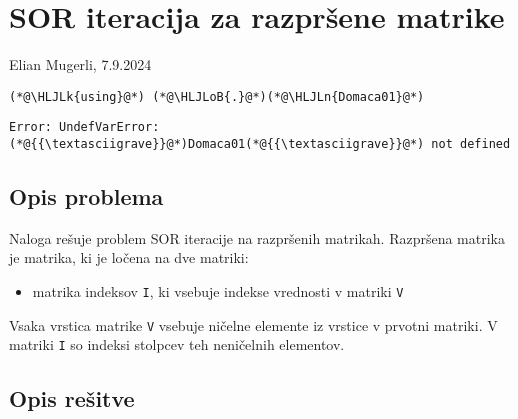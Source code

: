 \documentclass[12pt,a4paper]{article}
\newcommand{\HLJLk}[1]{\textcolor[RGB]{148,91,176}{\textbf{#1}}}
\newcommand{\HLJLn}[1]{#1}
\newcommand{\HLJLoB}[1]{\textcolor[RGB]{102,102,102}{\textbf{#1}}}
\begin{document}
\section{SOR iteracija za razpršene matrike}
Elian Mugerli, 7.9.2024


\begin{lstlisting}
(*@\HLJLk{using}@*) (*@\HLJLoB{.}@*)(*@\HLJLn{Domaca01}@*)
\end{lstlisting}

\begin{lstlisting}
Error: UndefVarError: (*@{{\textasciigrave}}@*)Domaca01(*@{{\textasciigrave}}@*) not defined
\end{lstlisting}


\subsection{Opis problema}

Naloga rešuje problem SOR iteracije na razpršenih matrikah. Razpršena matrika je matrika, ki je ločena na dve matriki:

\begin{itemize}
\item matrika indeksov \texttt{I}, ki vsebuje indekse vrednosti v matriki \texttt{V}

\end{itemize}
Vsaka vrstica matrike \texttt{V} vsebuje ničelne elemente iz vrstice v prvotni matriki. V matriki \texttt{I} so indeksi stolpcev teh neničelnih elementov.


\subsection{Opis rešitve}
\end{document}
